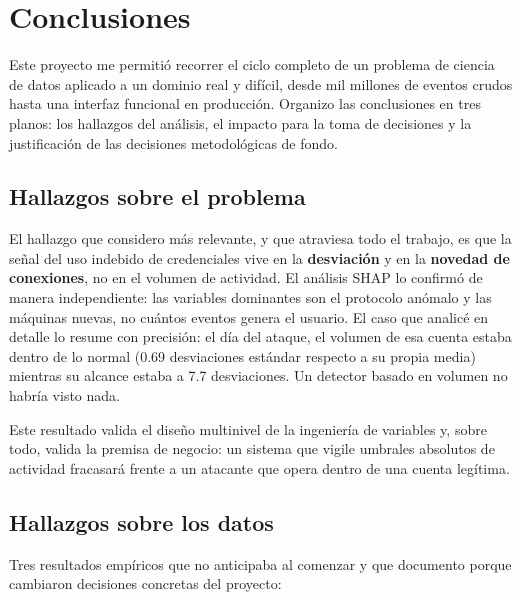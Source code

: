 \documentclass[12pt, a4paper]{article}
\begin{document}
\section{Conclusiones}

Este proyecto me permitió recorrer el ciclo completo de un problema de ciencia de datos aplicado a un
dominio real y difícil, desde mil millones de eventos crudos hasta una interfaz funcional en
producción. Organizo las conclusiones en tres planos: los hallazgos del análisis, el impacto para la
toma de decisiones y la justificación de las decisiones metodológicas de fondo.

\subsection{Hallazgos sobre el problema}

El hallazgo que considero más relevante, y que atraviesa todo el trabajo, es que la señal del uso
indebido de credenciales vive en la \textbf{desviación} y en la \textbf{novedad de conexiones}, no en
el volumen de actividad. El análisis SHAP lo confirmó de manera independiente: las variables
dominantes son el protocolo anómalo y las máquinas nuevas, no cuántos eventos genera el usuario. El
caso que analicé en detalle lo resume con precisión: el día del ataque, el volumen de esa cuenta
estaba dentro de lo normal (0.69 desviaciones estándar respecto a su propia media) mientras su
alcance estaba a 7.7 desviaciones. Un detector basado en volumen no habría visto nada.

Este resultado valida el diseño multinivel de la ingeniería de variables y, sobre todo, valida la
premisa de negocio: un sistema que vigile umbrales absolutos de actividad fracasará frente a un
atacante que opera dentro de una cuenta legítima.

\subsection{Hallazgos sobre los datos}

Tres resultados empíricos que no anticipaba al comenzar y que documento porque cambiaron decisiones
concretas del proyecto:
\end{document}

